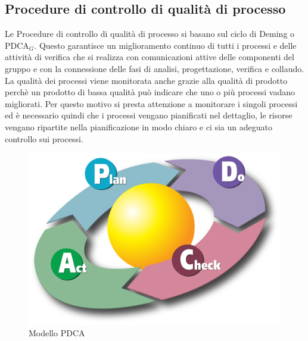 \subsection{Procedure di controllo di qualità di processo}
Le Procedure di controllo di qualità di processo si basano sul ciclo di Deming o PDCA$_G$. Questo garantisce un miglioramento continuo di tutti i processi e delle attività di verifica che si realizza con comunicazioni attive delle componenti del gruppo e con la connessione delle fasi di analisi, progettazione, verifica e collaudo.
La qualità dei processi viene monitorata anche grazie alla qualità di prodotto perchè un prodotto di bassa qualità può indicare che uno o più processi vadano migliorati. Per questo motivo si presta attenzione a monitorare i singoli processi ed è necessario quindi che i processi vengano pianificati nel dettaglio, le risorse vengano ripartite nella pianificazione in modo chiaro e ci sia un adeguato controllo sui processi.
\begin{figure}[h!]
		\centering
		\includegraphics[scale=.6]{img/2000px-PDCA_Cycle.svg.png}
		\caption{Modello PDCA}
		\label{fig:ModelloSpy}
\end{figure}